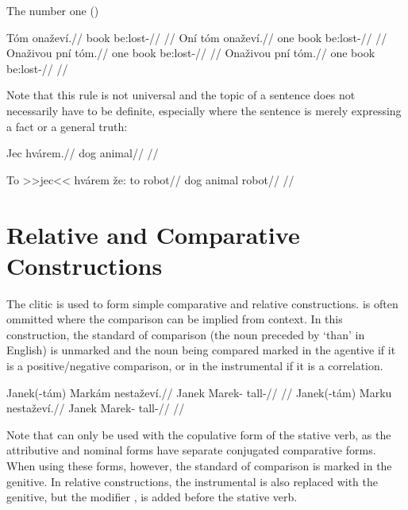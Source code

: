 The number one ()

\pex
\a
\begingl
\gla Tóm onaževí.//
\glb book be:lost-//
\glft {}//
\endgl
\a
\begingl
\gla Oní tóm onaževí.//
\glb one book be:lost-//
\glft {}//
\endgl
\a
\begingl
\gla Onaživou pní tóm.//
\glb one book be:lost-//
\glft {}//
\endgl
\a
\begingl
\gla Onaživou pní tóm.//
\glb one book be:lost-//
\glft {}//
\endgl
\xe


Note that this rule is not universal and the topic of a sentence does not necessarily have to be definite, especially where the sentence is merely expressing a fact or a general truth:

\pex
\begingl
\gla Jec hvárem.//
\glb dog animal//
\glft {}//
\endgl
\xe



\pex
\begingl
\gla To >>jec<< hvárem že: to robot//
\glb \Dem{} dog animal  \Dem{} robot//
\glft {}//
\endgl
\xe


\section{Relative and Comparative Constructions}\label{relativecomparative}

The clitic  is used to form simple comparative and relative constructions.  is often ommitted where the comparison can be implied from context. In this construction, the standard of comparison (the noun preceded by `than' in English) is unmarked and the noun being compared marked in the agentive if it is a positive/negative comparison, or in the instrumental if it is a correlation.


\pex
\a\begingl
\gla Janek(-t\'am) Markám nesta\v{z}ev\'i.//
\glb Janek Marek-\Agt{} tall-//
\glft {}//
\endgl
\a\begingl
\gla Janek(-t\'am) Marku nesta\v{z}ev\'i.//
\glb Janek Marek-\Ins{} tall-//
\glft {}//
\endgl
\xe

Note that  can only be used with the copulative form of the stative verb, as the attributive and nominal forms have separate conjugated comparative forms. When using these forms, however, the standard of comparison is marked in the genitive. In relative constructions, the instrumental is also replaced with the genitive, but the modifier ,  is added before the stative verb.

